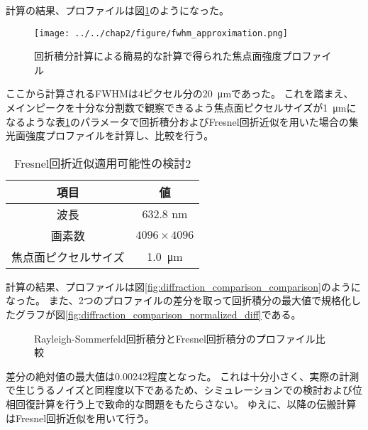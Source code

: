 計算の結果、プロファイルは図\ref{fig:fwhm_approximation}のようになった。

\begin{figure}[ht]
\centering
\texttt{[image: ../../chap2/figure/fwhm\_approximation.png]}
\caption{回折積分計算による簡易的な計算で得られた焦点面強度プロファイル}
\label{fig:fwhm_approximation}
\end{figure}

ここから計算されるFWHMは4ピクセル分の\SI{20}{\micro \metre}であった。
これを踏まえ、メインピークを十分な分割数で観察できるよう焦点面ピクセルサイズが\SI{1}{\micro \metre}になるような表\ref{tb:check_approximation_validity_2}のパラメータで回折積分およびFresnel回折近似を用いた場合の集光面強度プロファイルを計算し、比較を行う。

\begin{table}[!ht]
\begin{center}
  \begin{tabular}{|c|c|} \hline
    項目 & 値 \\ \hline
    波長 & 632.8 nm \\
    画素数 & $4096 \times 4096$ \\
    焦点面ピクセルサイズ & \SI{1.0}{\micro \metre} \\ \hline
  \end{tabular}
  \caption{Fresnel回折近似適用可能性の検討2}
  \label{tb:check_approximation_validity_2}
\end{center}
\end{table}

計算の結果、プロファイルは図\ref{fig:diffraction_comparison_comparison}のようになった。
また、2つのプロファイルの差分を取って回折積分の最大値で規格化したグラフが図\ref{fig:diffraction_comparison_normalized_diff}である。

\begin{figure}[!ht]
\centering


\caption[]{Rayleigh-Sommerfeld回折積分とFresnel回折積分のプロファイル比較}
\label{fig:diffraction_comparison}
\end{figure}

差分の絶対値の最大値は0.00242程度となった。
これは十分小さく、実際の計測で生じうるノイズと同程度以下であるため、シミュレーションでの検討および位相回復計算を行う上で致命的な問題をもたらさない。
ゆえに、以降の伝搬計算はFresnel回折近似を用いて行う。

